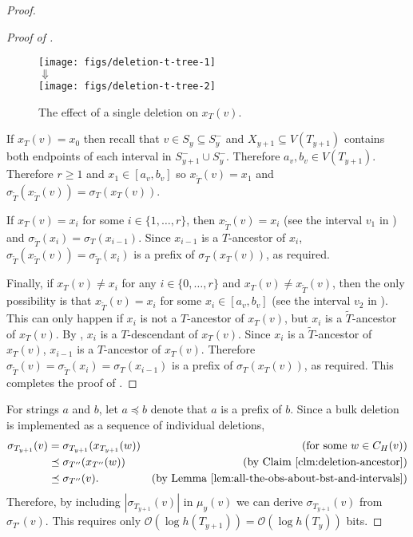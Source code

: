 \documentclass[kpfonts]{patmorin}
\newcommand{\Oh}{\mathcal{O}}
\let\ge\geqslant
\begin{document}
\begin{proof}
\begin{proof}[Proof of ]
    \begin{figure}
      \begin{center}
        \texttt{[image: figs/deletion-t-tree-1]}\\[1ex]
        $\Downarrow$\\[1ex]
        \texttt{[image: figs/deletion-t-tree-2]}
      \end{center}
      \caption{The effect of a single deletion on $x_T(v)$.}
    \end{figure}

    If $x_T(v)=x_0$ then recall that $v\in S_y\subseteq S^-_y$ and $X_{y+1}\subseteq V(T_{y+1})$ contains both endpoints of each interval in $S^-_{y+1}\cup S^-_y$.  Therefore $a_v,b_v\in V(T_{y+1})$.  Therefore $r\ge 1$ and $x_1\in [a_v,b_v]$ so $x_{\tilde{T}}(v)=x_1$ and $\sigma_{\tilde{T}}(x_{\tilde{T}}(v))=\sigma_T(x_T(v))$.

    If $x_T(v)=x_i$ for some $i\in\{1,\ldots,r\}$, then $x_{\tilde{T}}(v)=x_i$ (see the interval $v_1$ in ) and $\sigma_{\tilde{T}}(x_i)=\sigma_{T}(x_{i-1})$.  Since $x_{i-1}$ is a $T$-ancestor of $x_i$, $\sigma_{\tilde{T}}(x_{\tilde{T}}(v))=\sigma_{\tilde{T}}(x_i)$ is a prefix of $\sigma_{T}(x_{T}(v))$, as required.

    Finally, if $x_T(v)\neq x_i$ for any $i\in\{0,\ldots,r\}$ and $x_T(v)\neq x_{\tilde{T}}(v)$, then the only possibility is that $x_{\tilde{T}}(v)=x_i$ for some $x_i\in [a_v,b_v]$ (see the interval $v_2$ in ).  This can only happen if $x_i$ is not a $T$-ancestor of $x_T(v)$, but $x_i$ is a $\tilde{T}$-ancestor of $x_T(v)$.  By , $x_i$ is a $T$-descendant of $x_T(v)$.  Since $x_i$ is a $\tilde{T}$-ancestor of $x_T(v)$, $x_{i-1}$ is a $T$-ancestor of $x_T(v)$.  Therefore $\sigma_{\tilde{T}}(v)=\sigma_{\tilde{T}}(x_i)=\sigma_T(x_{i-1})$ is a prefix of $\sigma_T(x_T(v))$, as required.  This completes the proof of .
  \end{proof}

  For strings $a$ and $b$, let $a\preceq b$ denote that $a$ is a prefix of $b$.
  Since a bulk deletion is implemented as a sequence of individual deletions,
  \begin{align*}
    \sigma_{T_{y+1}}(v)
      & = \sigma_{T_{y+1}}(x_{T_{y+1}}(w)) & \text{(for some $w\in C_H(v)$)} \\
      & \preceq \sigma_{T''}(x_{T''}(w)) & \text{(by \clmref{deletion-ancestor})} \\
      & \preceq \sigma_{T''}(v). & \text{(by \lemref{all-the-obs-about-bst-and-intervals})}
  \end{align*}
  Therefore, by including $|\sigma_{T_{y+1}}(v)|$ in $\mu_y(v)$ we can derive $\sigma_{T_{y+1}}(v)$ from $\sigma_{T'}(v)$.  This requires only $\Oh(\log h({T_{y+1}}))=\Oh(\log h({T_y}))$ bits.


\end{proof}
\end{document}
